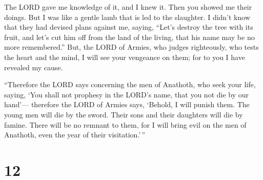  The LORD gave me knowledge of it, and I knew it. Then you
showed me their doings.  But I was like a gentle lamb that
is led to the slaughter. I didn't know that they had devised plans
against me, saying, ``Let's destroy the tree with its fruit, and let's
cut him off from the land of the living, that his name may be no more
remembered.''  But, the LORD of Armies, who judges
righteously, who tests the heart and the mind, I will see your vengeance
on them; for to you I have revealed my cause.

 ``Therefore the LORD says concerning the men of Anathoth,
who seek your life, saying, `You shall not prophesy in the LORD's name,
that you not die by our hand'---  therefore the LORD of
Armies says, `Behold, I will punish them. The young men will die by the
sword. Their sons and their daughters will die by famine. 
There will be no remnant to them, for I will bring evil on the men of
Anathoth, even the year of their visitation.'\,''

\hypertarget{section-11}{%
\section{12}\label{section-11}}

